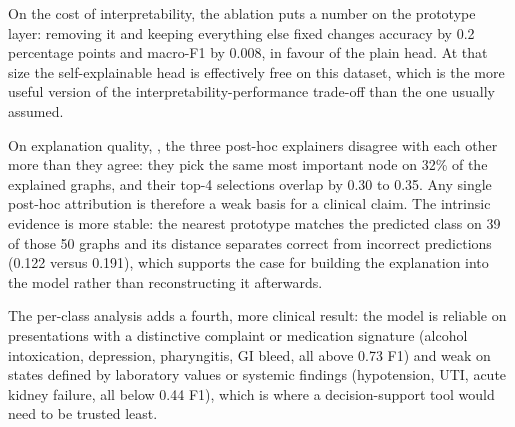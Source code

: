 On the cost of interpretability, the ablation puts a number on the prototype
layer: removing it and keeping everything else fixed changes accuracy by 0.2
percentage points and macro-F1 by 0.008, in favour of the plain head. At that
size the self-explainable head is effectively free on this dataset, which is the
more useful version of the interpretability-performance trade-off than the one
usually assumed.

On explanation quality, , the three post-hoc explainers disagree with each other more than they
agree: they pick the same most important node on 32\% of the explained graphs,
and their top-4 selections overlap by 0.30 to 0.35. Any single post-hoc
attribution is therefore a weak basis for a clinical claim. The intrinsic
evidence is more stable: the nearest prototype matches the predicted class on 39
of those 50 graphs and its distance separates correct from incorrect predictions
(0.122 versus 0.191), which supports the case for building the explanation into
the model rather than reconstructing it afterwards. 

The per-class analysis adds a fourth, more clinical result: the model is
reliable on presentations with a distinctive complaint or medication signature
(alcohol intoxication, depression, pharyngitis, GI bleed, all above 0.73 F1) and
weak on states defined by laboratory values or systemic findings (hypotension,
UTI, acute kidney failure, all below 0.44 F1), which is where a decision-support
tool would need to be trusted least.


